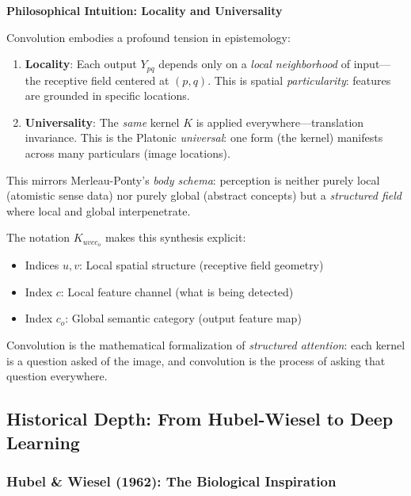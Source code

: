 \begin{philobox}
	\textbf{Philosophical Intuition: Locality and Universality}
	
	Convolution embodies a profound tension in epistemology:
	
	\begin{enumerate}
		\item \textbf{Locality}: Each output $Y_{pq}$ depends only on a \textit{local neighborhood} of input---the receptive field centered at $(p,q)$. This is spatial \textit{particularity}: features are grounded in specific locations.
		
		\item \textbf{Universality}: The \textit{same} kernel $K$ is applied everywhere---translation invariance. This is the Platonic \textit{universal}: one form (the kernel) manifests across many particulars (image locations).
	\end{enumerate}
	
	This mirrors Merleau-Ponty's \textit{body schema}: perception is neither purely local (atomistic sense data) nor purely global (abstract concepts) but a \textit{structured field} where local and global interpenetrate.
	
	The notation $K_{uvc c_o}$ makes this synthesis explicit:
	\begin{itemize}
		\item Indices $u, v$: Local spatial structure (receptive field geometry)
		\item Index $c$: Local feature channel (what is being detected)
		\item Index $c_o$: Global semantic category (output feature map)
	\end{itemize}
	
	Convolution is the mathematical formalization of \textit{structured attention}: each kernel is a question asked of the image, and convolution is the process of asking that question everywhere.
\end{philobox}

\subsection{Historical Depth: From Hubel-Wiesel to Deep Learning}

\subsubsection{Hubel \& Wiesel (1962): The Biological Inspiration}

